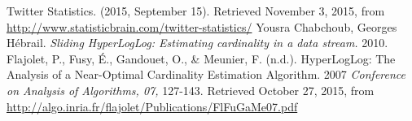 \documentclass{article}
\begin{document}
\begin{thebibliography}{9}
 Twitter Statistics. (2015, September 15). Retrieved November 3, 2015, from \url{http://www.statisticbrain.com/twitter-statistics/}
Yousra Chabchoub, Georges H\'ebrail. \textit{Sliding HyperLogLog: Estimating cardinality in a data stream.} 2010. 
 Flajolet, P., Fusy, \'E., Gandouet, O., \& Meunier, F. (n.d.). HyperLogLog: The Analysis of a Near-Optimal Cardinality Estimation Algorithm. 2007 \textit{Conference on Analysis of Algorithms, 07,} 127-143. Retrieved October 27, 2015, from \url{http://algo.inria.fr/flajolet/Publications/FlFuGaMe07.pdf}
\end{thebibliography}
\end{document}
